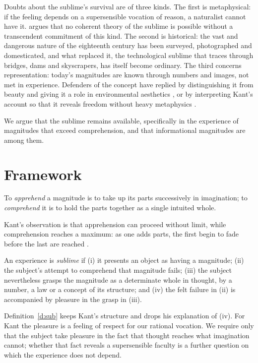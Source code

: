 \documentclass{situationist-preprint}
\begin{document}
Doubts about the sublime's survival are of three kinds. The first is metaphysical: if the feeling depends on a supersensible vocation of reason, a naturalist cannot have it. \citet{Forsey2007} argues that no coherent theory of the sublime is possible without a transcendent commitment of this kind. The second is historical: the vast and dangerous nature of the eighteenth century has been surveyed, photographed and domesticated, and what replaced it, the technological sublime that \citet{Nye1994} traces through bridges, dams and skyscrapers, has itself become ordinary. The third concerns representation: today's magnitudes are known through numbers and images, not met in experience. Defenders of the concept have replied by distinguishing it from beauty and giving it a role in environmental aesthetics \citep{Brady2013,Shapshay2013}, or by interpreting Kant's account so that it reveals freedom without heavy metaphysics \citep{Clewis2009}.

We argue that the sublime remains available, specifically in the experience of magnitudes that exceed comprehension, and that informational magnitudes are among them.

\section{Framework}

\begin{definition}\label{d:comp}
To \emph{apprehend} a magnitude is to take up its parts successively in imagination; to \emph{comprehend} it is to hold the parts together as a single intuited whole.
\end{definition}

Kant's observation is that apprehension can proceed without limit, while comprehension reaches a maximum: as one adds parts, the first begin to fade before the last are reached \citep[\S 26]{Kant1790}.

\begin{definition}\label{d:sub}
An experience is \emph{sublime} if (i) it presents an object as having a magnitude; (ii) the subject's attempt to comprehend that magnitude fails; (iii) the subject nevertheless grasps the magnitude as a determinate whole in thought, by a number, a law or a concept of its structure; and (iv) the felt failure in (ii) is accompanied by pleasure in the grasp in (iii).
\end{definition}

Definition~\ref{d:sub} keeps Kant's structure and drops his explanation of (iv). For Kant the pleasure is a feeling of respect for our rational vocation. We require only that the subject take pleasure in the fact that thought reaches what imagination cannot; whether that fact reveals a supersensible faculty is a further question on which the experience does not depend.
\end{document}
